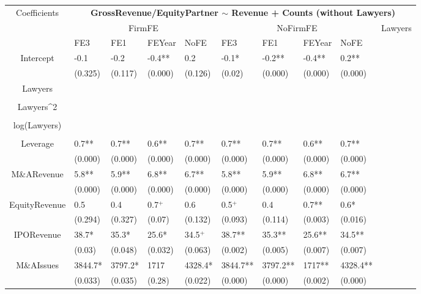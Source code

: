 \documentclass{article}
\begin{document}
\begin{table}[H]
\centering
\begin{tabular}{|clllllllll|}
\hline
\multirow{3}{*}{Coefficients} & \multicolumn{9}{c|}{\textbf{GrossRevenue/EquityPartner $\sim$ Revenue + Counts (without Lawyers)}} \\
\cline{2-10}
& \multicolumn{4}{c}{FirmFE} & \multicolumn{4}{c}{NoFirmFE} & \multirow{2}{*}{Lawyers} \\
\cline{2-9}
& FE3 & FE1 & FEYear & NoFE & FE3 & FE1 & FEYear & NoFE &  \\
\hline
 
Intercept & -0.1 & -0.2 & -0.4** & 0.2 & -0.1* & -0.2** & -0.4** & 0.2** & \\ 
   & (0.325) & (0.117) & (0.000) & (0.126) & (0.02) & (0.000) & (0.000) & (0.000) & \\ 
  Lawyers &  &  &  &  &  &  &  &  & \\ 
   &  &  &  &  &  &  &  &  & \\ 
  Lawyers^2 &  &  &  &  &  &  &  &  & \\ 
   &  &  &  &  &  &  &  &  & \\ 
  log(Lawyers) &  &  &  &  &  &  &  &  & \\ 
   &  &  &  &  &  &  &  &  & \\ 
  Leverage & 0.7** & 0.7** & 0.6** & 0.7** & 0.7** & 0.7** & 0.6** & 0.7** & \\ 
   & (0.000) & (0.000) & (0.000) & (0.000) & (0.000) & (0.000) & (0.000) & (0.000) & \\ 
  M\&ARevenue & 5.8** & 5.9** & 6.8** & 6.7** & 5.8** & 5.9** & 6.8** & 6.7** & \\ 
   & (0.000) & (0.000) & (0.000) & (0.000) & (0.000) & (0.000) & (0.000) & (0.000) & \\ 
  EquityRevenue & 0.5 & 0.4 & 0.7$^{+}$ & 0.6 & 0.5$^{+}$ & 0.4 & 0.7** & 0.6* & \\ 
   & (0.294) & (0.327) & (0.07) & (0.132) & (0.093) & (0.114) & (0.003) & (0.016) & \\ 
  IPORevenue & 38.7* & 35.3* & 25.6* & 34.5$^{+}$ & 38.7** & 35.3** & 25.6** & 34.5** & \\ 
   & (0.03) & (0.048) & (0.032) & (0.063) & (0.002) & (0.005) & (0.007) & (0.007) & \\ 
  M\&AIssues & 3844.7* & 3797.2* & 1717 & 4328.4* & 3844.7** & 3797.2** & 1717** & 4328.4** & \\ 
   & (0.033) & (0.035) & (0.28) & (0.022) & (0.000) & (0.000) & (0.002) & (0.000) & \\ 

\end{tabular}
\end{table}
\end{document}
